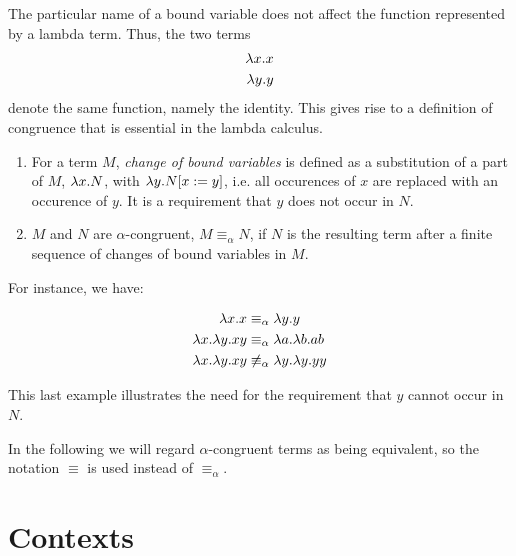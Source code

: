 The particular name of a bound variable does not affect the function represented 
by a lambda term. Thus, the two terms
\begin{align*}
	\lambda x.x \\
	\lambda y.y
\end{align*}
denote the same function, namely the identity. This gives rise to a definition of congruence
that is essential in the lambda calculus.
\begin{definition}\mbox{}
	\begin{enumerate}
		\item For a term $M$, \emph{change of bound variables} is defined as a substitution
		of a part of $M$, $\lambda x.N$, with $\lambda y.N[x:=y]$, i.e. all occurences of $x$
		are replaced with an occurence of $y$. It is a requirement that $y$ does not 
		occur in $N$.
		\item $M$ and $N$ are $\alpha$-congruent, $M\equiv_\alpha N$, if $N$ is the
		resulting term after a finite sequence of changes of bound variables in $M$.
	\end{enumerate}
\end{definition} 
For instance, we have:
\begin{example}
\begin{align*}
	\lambda x.x&\equiv_\alpha\lambda y.y \\
	\lambda x.\lambda y.xy&\equiv_\alpha{\lambda a.\lambda b.ab} \\
	\lambda x.\lambda y.xy&\not\equiv_\alpha\lambda y.\lambda y.yy
\end{align*}
\end{example}
This last example illustrates the need for the requirement that $y$ cannot
occur in $N$. 
\begin{convention}
	\label{con:alpha}
	In the following we will regard $\alpha$-congruent terms as
	being equivalent, so the notation $\equiv$ is used instead of
	$\equiv_\alpha$.
\end{convention}

\section{Contexts}

